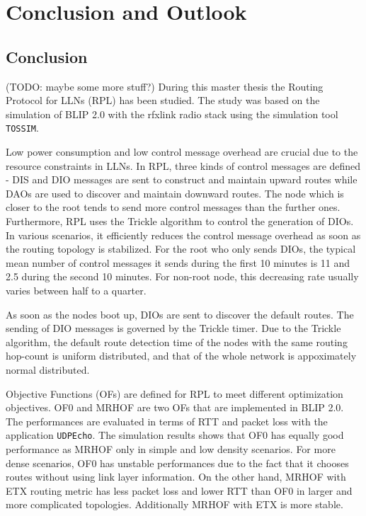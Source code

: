 \chapter{Conclusion and Outlook}
\label{Con}
\section{Conclusion} 
\label{Con:Con}
(TODO: maybe some more stuff?)
During this master thesis the Routing Protocol for LLNs (RPL) has been studied. The study was based on the simulation of BLIP 2.0 with the rfxlink radio stack using the simulation tool \texttt{TOSSIM}. 
\newline

Low power consumption and low control message overhead are crucial due to the resource constraints in LLNs. In RPL, three kinds of control messages are defined - DIS and DIO messages are sent to construct and maintain upward routes while DAOs are used to discover and maintain downward routes. The node which is closer to the root tends to send more control messages than the further ones. Furthermore, RPL uses the Trickle algorithm to control the generation of DIOs. In various scenarios, it efficiently reduces the control message overhead as soon as the routing topology is stabilized. For the root who only sends DIOs, the typical mean number of control messages it sends during the first 10 minutes is 11 and 2.5 during the second 10 minutes. For non-root node, this decreasing rate usually varies between half to a quarter.
\newline

As soon as the nodes boot up, DIOs are sent to discover the default routes. The sending of DIO messages is governed by the Trickle timer. Due to the Trickle algorithm, the default route detection time of the nodes with the same routing hop-count is uniform distributed, and that of the whole network is appoximately normal distributed. 
\newline
 
Objective Functions (OFs) are defined for RPL to meet different optimization objectives. OF0 and MRHOF are two OFs that are implemented in BLIP 2.0. The performances are evaluated in terms of RTT and packet loss with the application \texttt{UDPEcho}\@. The simulation results shows that OF0 has equally good performance as MRHOF only in simple and low density scenarios. For more dense scenarios, OF0 has unstable performances due to the fact that it chooses routes without using link layer information. On the other hand, MRHOF with ETX routing metric has less packet loss and lower RTT than OF0 in larger and more complicated topologies. Additionally MRHOF with ETX is more stable.  
\newline

